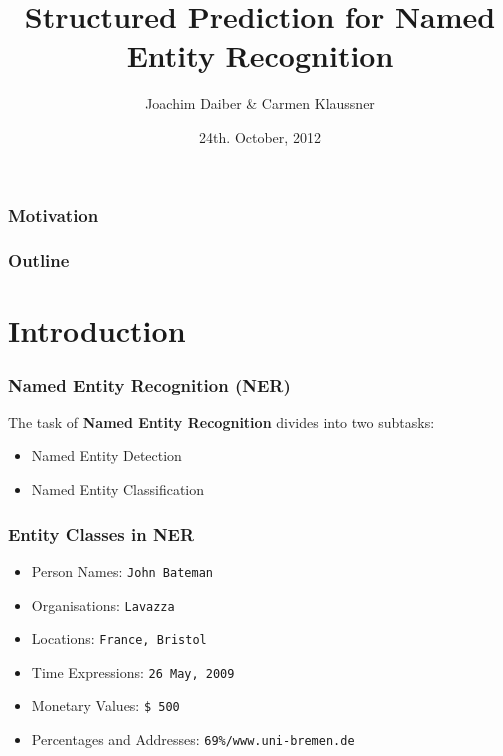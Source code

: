 \documentclass[10pt]{beamer}
\title[Machine Learning] %
{
Structured Prediction for Named Entity Recognition}
\author %
{Joachim Daiber \& Carmen Klaussner}
\institute[University of Groningen] %
 {
  Information Science\\
  University of Groningen
  }
\date[Short Occasion] %
{24th. October, 2012}
\begin{document}
\begin{frame}
  \titlepage
\end{frame}



\begin{frame}
\frametitle{Motivation}


\end{frame}







\begin{frame}
  \frametitle{Outline}
  \tableofcontents
\end{frame}





\section{Introduction}
\begin{frame}
\frametitle{Named Entity Recognition (NER)}

The task of \textbf{Named Entity Recognition} divides into 
two subtasks: \\
\begin{itemize}
 \item Named Entity Detection 
 \item Named Entity Classification
\end{itemize}
\end{frame}




\begin{frame}
\frametitle{Entity Classes in NER}

\begin{itemize}
 \item Person Names: \texttt{John Bateman}
 \item Organisations: \texttt{Lavazza}
 \item Locations: \texttt{France, Bristol}
 \item Time Expressions: \texttt{26 May, 2009}	
 \item Monetary Values: \texttt{\$ 500}	
 \item Percentages and Addresses: \texttt{69\%/www.uni-bremen.de}

\end{itemize}	
 \end{frame}
\end{document}

